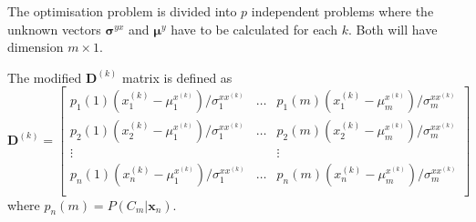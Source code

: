 The optimisation problem is divided into $p$ independent problems where the unknown vectors $\boldsymbol{\sigma}^{yx}$ and $\boldsymbol{\mu}^{y}$ have to be calculated for each $k$. Both will have dimension $m\times 1$.

The modified $\mathbf{D}^{(k)}$ matrix is defined as
\begin{equation}
	\label{eq:D_matrix_new}
	\mathbf{D}^{(k)} = \begin{bmatrix}
		p_1(1)(x_1^{(k)} - \mu_1^{x^{(k)}})/\sigma_1^{xx^{(k)}} & \dots & p_1(m)(x_1^{(k)} - \mu_m^{x^{(k)}})/\sigma_m^{xx^{(k)}} \\
		p_2(1)(x_2^{(k)} - \mu_1^{x^{(k)}})/\sigma_1^{xx^{(k)}} & \dots & p_2(m)(x_2^{(k)} - \mu_m^{x^{(k)}})/\sigma_m^{xx^{(k)}} \\
		\vdots & & \vdots \\
		p_n(1)(x_n^{(k)} - \mu_1^{x^{(k)}})/\sigma_1^{xx^{(k)}} & \dots & p_n(m)(x_n^{(k)} - \mu_m^{x^{(k)}})/\sigma_m^{xx^{(k)}} \\
	\end{bmatrix}
\end{equation}
where $p_n(m)=P(C_m\vert \mathbf{x}_n)$.
